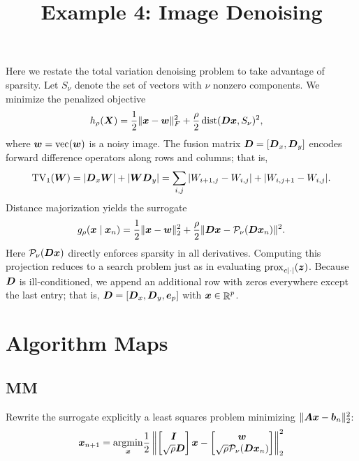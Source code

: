 \documentclass[11pt]{article}
\title{Example 4: Image Denoising}
\author{}
\date{}
\begin{document}
\maketitle

Here we restate the total variation denoising problem to take advantage of sparsity.
Let \(S_{\nu}\) denote the set of vectors with $\nu$ nonzero components.
We minimize the penalized objective
\begin{align*}
    h_{\rho}(\boldsymbol{X})
    &=
    \frac{1}{2}\|\boldsymbol{x} - \boldsymbol{w}\|_{F}^{2}
    +
    \frac{\rho}{2} \mathop{\rm dist}\nolimits(\boldsymbol{D} \boldsymbol{x}, S_{\nu})^{2},
\end{align*}
where $\boldsymbol{w} = \mathop{\rm vec}\nolimits(\boldsymbol{w})$ is a noisy image.
The fusion matrix $\boldsymbol{D} = [\boldsymbol{D}_{x},\boldsymbol{D}_{y}]$ encodes forward difference operators along rows and columns; that is,
\begin{equation*}
    \mathrm{TV}_{1}(\boldsymbol{W})
    =
    |\boldsymbol{D}_{x} \boldsymbol{W}| + |\boldsymbol{W} \boldsymbol{D}_{y}|
    =
    \sum_{i,j} |W_{i+1,j} - W_{i,j}| + |W_{i,j+1} - W_{i,j}|.
\end{equation*}
Distance majorization yields the surrogate
\begin{equation*}
    g_{\rho}(\boldsymbol{x} \mid \boldsymbol{x}_{n})
    =
    \frac{1}{2}\|\boldsymbol{x} - \boldsymbol{w}\|_{2}^{2}
    +
    \frac{\rho}{2} \|\boldsymbol{D} \boldsymbol{x} - \mathcal{P}_{\nu}(\boldsymbol{D} \boldsymbol{x}_{n})\|^{2}.
\end{equation*}
Here $\mathcal{P}_{\nu}(\boldsymbol{D} \boldsymbol{x})$ directly enforces sparsity in all derivatives.
Computing this projection reduces to a search problem just as in evaluating $\mathrm{prox}_{c|\cdot|}(\boldsymbol{z})$.
Because $\boldsymbol{D}$ is ill-conditioned, we append an additional row with zeros everywhere except the last entry; that is, $\boldsymbol{D} = [\boldsymbol{D}_{x}, \boldsymbol{D}_{y}, \boldsymbol{e}_{p}]$ with $\boldsymbol{x} \in \mathop{\mathbb{R}}\nolimits^{p}$.

\section*{\center Algorithm Maps}

\subsection*{MM}
Rewrite the surrogate explicitly a least squares problem minimizing $\|\boldsymbol{A} \boldsymbol{x} - \boldsymbol{b}_{n}\|^{2}_{2}$:
\begin{equation*}
  \boldsymbol{x}_{n+1} = \underset{\boldsymbol{x}}{\mathop{\rm argmin}\nolimits} \frac{1}{2} \left\|
    \begin{bmatrix}
      \boldsymbol{I} \\
      \sqrt{\rho} \boldsymbol{D}
    \end{bmatrix} \boldsymbol{x}
    -
    \begin{bmatrix}
      \boldsymbol{w} \\
      \sqrt{\rho} \mathcal{P}_{\nu}(\boldsymbol{D} \boldsymbol{x}_{n})
    \end{bmatrix}
  \right\|_{2}^{2}
\end{equation*}
\end{document}
